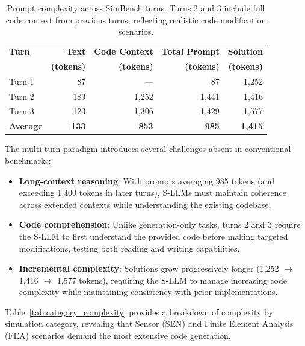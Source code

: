 \documentclass{ieeeaccess}
\begin{document}
\begin{table}[h!]
    \centering
    \caption{Prompt complexity across SimBench turns. Turns 2 and 3 include full code context from previous turns, reflecting realistic code modification scenarios.}
    \label{tab:turn_complexity}
    \begin{tabular}{l r r r r}
        \toprule
        \textbf{Turn} & \textbf{Text} & \textbf{Code Context} & \textbf{Total Prompt} & \textbf{Solution} \\
        & \textbf{(tokens)} & \textbf{(tokens)} & \textbf{(tokens)} & \textbf{(tokens)} \\
        \midrule
        Turn 1 & 87 & --- & 87 & 1,252 \\
        Turn 2 & 189 & 1,252 & 1,441 & 1,416 \\
        Turn 3 & 123 & 1,306 & 1,429 & 1,577 \\
        \midrule
        \textbf{Average} & \textbf{133} & \textbf{853} & \textbf{985} & \textbf{1,415} \\
        \bottomrule
    \end{tabular}
\end{table}

The multi-turn paradigm introduces several challenges absent in conventional benchmarks:
\begin{itemize}
    \item \textbf{Long-context reasoning}: With prompts averaging 985 tokens (and exceeding 1,400 tokens in later turns), S-LLMs must maintain coherence across extended contexts while understanding the existing codebase.
    \item \textbf{Code comprehension}: Unlike generation-only tasks, turns 2 and 3 require the S-LLM to first understand the provided code before making targeted modifications, testing both reading and writing capabilities.
    \item \textbf{Incremental complexity}: Solutions grow progressively longer (1,252 $\rightarrow$ 1,416 $\rightarrow$ 1,577 tokens), requiring the S-LLM to manage increasing code complexity while maintaining consistency with prior implementations.
\end{itemize}

Table~\ref{tab:category_complexity} provides a breakdown of complexity by simulation category, revealing that Sensor (SEN) and Finite Element Analysis (FEA) scenarios demand the most extensive code generation.
\end{document}

